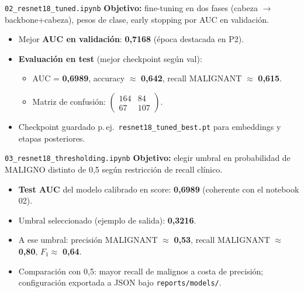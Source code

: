 \documentclass[aspectratio=169,spanish]{beamer}
\begin{document}
\begin{frame}{\texttt{02\_resnet18\_tuned.ipynb}}
  \textbf{Objetivo:} fine-tuning en dos fases (cabeza $\rightarrow$ backbone+cabeza), pesos de clase, early stopping por AUC en validación.
  \begin{itemize}
    \item Mejor \textbf{AUC en validación}: \textbf{0{,}7168} (época destacada en P2).
    \item \textbf{Evaluación en test} (mejor checkpoint según val):
      \begin{itemize}
        \item AUC = \textbf{0{,}6989}, accuracy $\approx$ \textbf{0{,}642}, recall MALIGNANT $\approx$ \textbf{0{,}615}.
        \item Matriz de confusión: $\begin{pmatrix}164&84\\67&107\end{pmatrix}$.
      \end{itemize}
    \item Checkpoint guardado p.\,ej.\ \texttt{resnet18\_tuned\_best.pt} para embeddings y etapas posteriores.
  \end{itemize}
\end{frame}

\begin{frame}{\texttt{03\_resnet18\_thresholding.ipynb}}
  \textbf{Objetivo:} elegir umbral en probabilidad de MALIGNO distinto de 0{,}5 según restricción de recall clínico.
  \begin{itemize}
    \item \textbf{Test AUC} del modelo calibrado en score: \textbf{0{,}6989} (coherente con el notebook 02).
    \item Umbral seleccionado (ejemplo de salida): \textbf{0{,}3216}.
    \item A ese umbral: precisión MALIGNANT $\approx$ \textbf{0{,}53}, recall MALIGNANT $\approx$ \textbf{0{,}80}, $F_1 \approx$ \textbf{0{,}64}.
    \item Comparación con 0{,}5: mayor recall de malignos a costa de precisión; configuración exportada a JSON bajo \texttt{reports/models/}.
  \end{itemize}
\end{frame}
\end{document}
